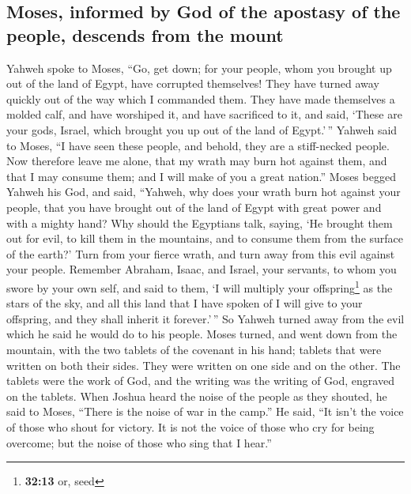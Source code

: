 \hypertarget{moses-informed-by-god-of-the-apostasy-of-the-people-descends-from-the-mount}{%
\subsection{Moses, informed by God of the apostasy of the people,
descends from the
mount}\label{moses-informed-by-god-of-the-apostasy-of-the-people-descends-from-the-mount}}

 Yahweh spoke to Moses, ``Go, get down; for your people,
whom you brought up out of the land of Egypt, have corrupted themselves!
 They have turned away quickly out of the way which I
commanded them. They have made themselves a molded calf, and have
worshiped it, and have sacrificed to it, and said, `These are your gods,
Israel, which brought you up out of the land of Egypt.'\,''
 Yahweh said to Moses, ``I have seen these people, and
behold, they are a stiff-necked people.  Now therefore
leave me alone, that my wrath may burn hot against them, and that I may
consume them; and I will make of you a great nation.'' 
Moses begged Yahweh his God, and said, ``Yahweh, why does your wrath
burn hot against your people, that you have brought out of the land of
Egypt with great power and with a mighty hand?  Why
should the Egyptians talk, saying, `He brought them out for evil, to
kill them in the mountains, and to consume them from the surface of the
earth?' Turn from your fierce wrath, and turn away from this evil
against your people.  Remember Abraham, Isaac, and
Israel, your servants, to whom you swore by your own self, and said to
them, `I will multiply your offspring\footnote{\textbf{32:13} or, seed}
as the stars of the sky, and all this land that I have spoken of I will
give to your offspring, and they shall inherit it forever.'\,''
 So Yahweh turned away from the evil which he said he
would do to his people.  Moses turned, and went down from
the mountain, with the two tablets of the covenant in his hand; tablets
that were written on both their sides. They were written on one side and
on the other.  The tablets were the work of God, and the
writing was the writing of God, engraved on the tablets. 
When Joshua heard the noise of the people as they shouted, he said to
Moses, ``There is the noise of war in the camp.''  He
said, ``It isn't the voice of those who shout for victory. It is not the
voice of those who cry for being overcome; but the noise of those who
sing that I hear.''

